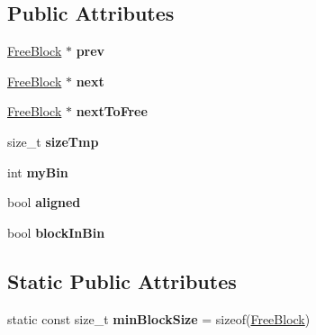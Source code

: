 \subsection*{Public Attributes}
\begin{DoxyCompactItemize}
\item 
\hypertarget{classrml_1_1internal_1_1FreeBlock_a3890a43039a9aa4263209d289b99a5f5}{}\hyperlink{classrml_1_1internal_1_1FreeBlock}{Free\+Block} $\ast$ {\bfseries prev}\label{classrml_1_1internal_1_1FreeBlock_a3890a43039a9aa4263209d289b99a5f5}

\item 
\hypertarget{classrml_1_1internal_1_1FreeBlock_a4f8f5b6624ca1156d114636545df9405}{}\hyperlink{classrml_1_1internal_1_1FreeBlock}{Free\+Block} $\ast$ {\bfseries next}\label{classrml_1_1internal_1_1FreeBlock_a4f8f5b6624ca1156d114636545df9405}

\item 
\hypertarget{classrml_1_1internal_1_1FreeBlock_a12d3a961b4a80692682efaa6b6a4ca7f}{}\hyperlink{classrml_1_1internal_1_1FreeBlock}{Free\+Block} $\ast$ {\bfseries next\+To\+Free}\label{classrml_1_1internal_1_1FreeBlock_a12d3a961b4a80692682efaa6b6a4ca7f}

\item 
\hypertarget{classrml_1_1internal_1_1FreeBlock_a594e33ba0fa27dd516f8ab159e604e70}{}size\+\_\+t {\bfseries size\+Tmp}\label{classrml_1_1internal_1_1FreeBlock_a594e33ba0fa27dd516f8ab159e604e70}

\item 
\hypertarget{classrml_1_1internal_1_1FreeBlock_a236dc29af3816add14a81310cb33eaac}{}int {\bfseries my\+Bin}\label{classrml_1_1internal_1_1FreeBlock_a236dc29af3816add14a81310cb33eaac}

\item 
\hypertarget{classrml_1_1internal_1_1FreeBlock_a5879253425432f551c1260dbf993b462}{}bool {\bfseries aligned}\label{classrml_1_1internal_1_1FreeBlock_a5879253425432f551c1260dbf993b462}

\item 
\hypertarget{classrml_1_1internal_1_1FreeBlock_a00fc0a609cf2ac2f00e70de227f30cb1}{}bool {\bfseries block\+In\+Bin}\label{classrml_1_1internal_1_1FreeBlock_a00fc0a609cf2ac2f00e70de227f30cb1}

\end{DoxyCompactItemize}
\subsection*{Static Public Attributes}
\begin{DoxyCompactItemize}
\item 
\hypertarget{classrml_1_1internal_1_1FreeBlock_a39998265a13976471f018c1e63d691ab}{}static const size\+\_\+t {\bfseries min\+Block\+Size} = sizeof(\hyperlink{classrml_1_1internal_1_1FreeBlock}{Free\+Block})\label{classrml_1_1internal_1_1FreeBlock_a39998265a13976471f018c1e63d691ab}

\end{DoxyCompactItemize}
